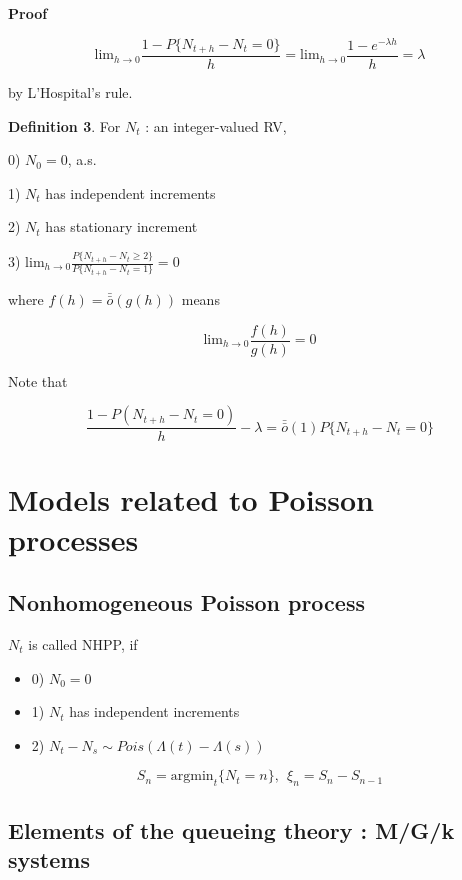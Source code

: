 \documentclass[12pt]{article}
\theoremstyle{nonumberbreak}
\begin{document}
\textbf{Proof} 

$$
\mathrm{lim}_{h \to 0} \frac{1 - P\{ N_{t+h} - N_t = 0 \}}{h} = \mathrm{lim}_{h \to 0} \frac{1-e^{-\lambda h}}{h} = \lambda
$$

by L'Hospital's rule.


\begin{theorem}
\textbf{Definition 3}. For $N_t$ : an integer-valued RV,
	\item 0) $N_0 = 0$, a.s.
	\item 1) $N_t$ has independent increments
	\item 2) $N_t$ has stationary increment 
	\item 3) $\mathrm{lim}_{h \to 0} \frac{P\{ N_{t+h} - N_t \ge 2 \}}{P\{ N_{t+h} - N_t = 1 \}} = 0 $
\end{theorem}


where $f(h) = \bar{\bar{o}} (g(h))$ means

$$
\mathrm{lim}_{h\to0} \frac{f(h)}{g(h)} = 0
$$ 

Note that 

$$
\frac{1 - P(N_{t+h} - N_t = 0) }{h} - \lambda = \bar{\bar{o}} (1) P\{ N_{t+h} - N_t = 0 \}
$$



\pagebreak
\section{Models related to Poisson processes}

\subsection{Nonhomogeneous Poisson process}


$N_t$ is called NHPP, if 

\begin{itemize}
	\item 0) $N_0 = 0$
	\item 1) $N_t$ has independent increments
	\item 2) $N_t - N_s \sim Pois(\Lambda(t) - \Lambda(s))$
\end{itemize}

$$
S_n = \mathrm{argmin}_t \{ N_t =n \}, \ \ \xi_n = S_n - S_{n-1}
$$

\subsection{Elements of the queueing theory : M/G/k systems}
\end{document}
